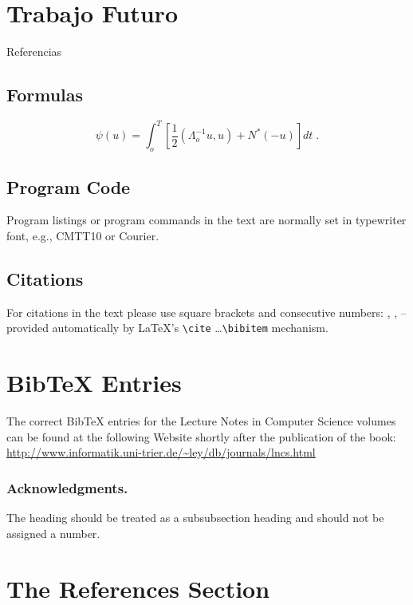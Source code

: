 \documentclass[runningheads,a4paper]{llncs}
\begin{document}
\section{Trabajo Futuro}

Referencias



\subsection{Formulas}

\begin{equation}
  \psi (u) = \int_{o}^{T} \left[\frac{1}{2}
  \left(\Lambda_{o}^{-1} u,u\right) + N^{\ast} (-u)\right] dt \;  .
\end{equation}



\subsection{Program Code}

Program listings or program commands in the text are normally set in
typewriter font, e.g., CMTT10 or Courier.


\subsection{Citations}

For citations in the text please use
square brackets and consecutive numbers: \cite{jour}, \cite{lncschap},
\cite{proceeding1} -- provided automatically
by \LaTeX 's \verb|\cite| \dots\verb|\bibitem| mechanism.

\section{BibTeX Entries}

The correct BibTeX entries for the Lecture Notes in Computer Science
volumes can be found at the following Website shortly after the
publication of the book:
\url{http://www.informatik.uni-trier.de/~ley/db/journals/lncs.html}

\subsubsection*{Acknowledgments.} The heading should be treated as a
subsubsection heading and should not be assigned a number.

\section{The References Section}\label{references}
\end{document}
